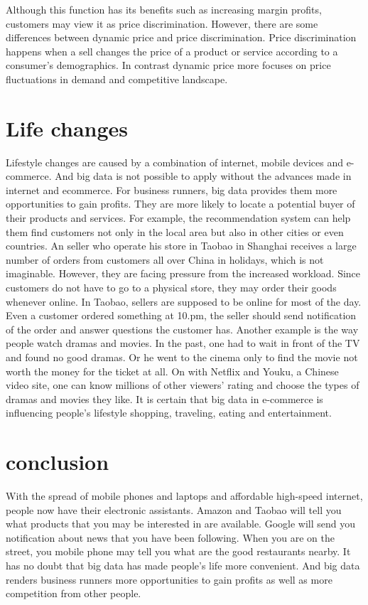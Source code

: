 \documentclass[sigconf]{acmart}
\begin{document}
Although this function has its benefits such as increasing margin profits, customers may view it as price discrimination. However, there are some differences between dynamic price and price discrimination. Price discrimination happens when a sell changes the price of a product or service according to a consumer's demographics. In contrast dynamic price more focuses on price fluctuations in demand and competitive landscape\cite{Smyth2015}.


\section{Life changes}
Lifestyle changes are caused by a combination of internet, mobile devices and e-commerce. And big data is not possible to apply without the advances made in internet and ecommerce. For business runners, big data provides them more opportunities to gain profits. They are more likely to locate a potential buyer of their products and services. For example, the recommendation system can help them find customers not only in the local area but also in other cities or even countries. An seller who operate his store in Taobao in Shanghai receives a large number of orders from customers all over China in holidays, which is not imaginable. However, they are facing pressure from the increased workload. Since customers do not have to go to a physical store, they may order their goods whenever online. In Taobao, sellers are supposed to be online for most of the day. Even a customer ordered something at 10.pm, the seller should send notification of the order and answer questions the customer has. Another example is the way people watch dramas and movies. In the past, one had to wait in front of the TV and found no good dramas. Or he went to the cinema only to find the movie not worth the money for the ticket at all. On with Netflix and Youku, a Chinese video site, one can know millions of other viewers’ rating and choose the types of dramas and movies they like. It is certain that big data in e-commerce is influencing people's lifestyle shopping, traveling, eating and entertainment.

\section{conclusion}
With the spread of mobile phones and laptops and affordable high-speed internet, people now have their electronic assistants. Amazon and Taobao will tell you what products that you may be interested in are available. Google will send you notification about news that you have been following.  When you are on the street, you mobile phone may tell you what are the good restaurants nearby. It has no doubt that big data has made people's life more convenient. And big data renders business runners more opportunities to gain profits as well as more competition from other people.



 



\end{document}
